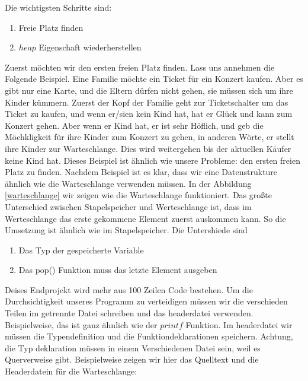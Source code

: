 Die wichtigsten Schritte sind:
\begin{enumerate}
\item Freie Platz finden
\item $heap$ Eigenschaft wiederherstellen
\end{enumerate}
Zuerst möchten wir den ersten freien Platz finden. Lass uns annehmen
die Folgende Beispiel. Eine Familie möchte ein Ticket für ein Konzert kaufen.
Aber es gibt nur eine Karte, und die Eltern dürfen nicht gehen, sie müssen sich 
um ihre Kinder kümmern. Zuerst der Kopf der Familie geht zur Ticketschalter
um das Ticket zu kaufen, und wenn er/sien  kein Kind hat, hat er Glück und
kann zum Konzert gehen. Aber wenn er Kind hat, er ist sehr Höflich, und 
geb die Möchkligkeit für ihre Kinder zum Konzert zu gehen, in anderen Wörte, er
stellt ihre Kinder zur Warteschlange. Dies wird weitergehen bis der aktuellen 
Käufer keine Kind hat. Dieses Beispiel ist ähnlich wie unsere Probleme: den
ersten freien Platz zu finden. Nachdem Beispiel ist es klar, dass wir eine
Datenstrukture ähnlich wie die Warteschlange verwenden müssen. 
In der Abbildung \ref{warteschlange} wir zeigen wie die Warteschlange
funktioniert. Das großte Unterschied zwischen Stapelspeicher und Werteschlange ist,
dass im Werteschlange das erste gekommene Element zuerst auskommen kann. 
So die Umsetzung ist ähnlich wie im Stapelspeicher. Die Untershiede sind
\begin{enumerate}
\item Das Typ der gespeicherte Variable
\item Das pop() Funktion muss das letzte Element ausgeben
\end{enumerate}

Deises Endprojekt wird mehr aus 100 Zeilen Code bestehen.
Um die Durchsichtigkeit unseres Programm zu verteidigen müssen
wir die verschieden Teilen im getrennte Datei schreiben und
das headerdatei verwenden. Beispielweise, das ist ganz ähnlich wie der 
$printf$ Funktion. Im headerdatei wir müssen die Typendefinition
und die Funktiondeklarationen speichern. Achtung, die Typ deklaration
müssen in einem Verschiedenen Datei sein, weil es Querverweise
gibt. Beispielweise zeigen wir hier das Quelltext und die Headerdatein
für die Warteschlange:

